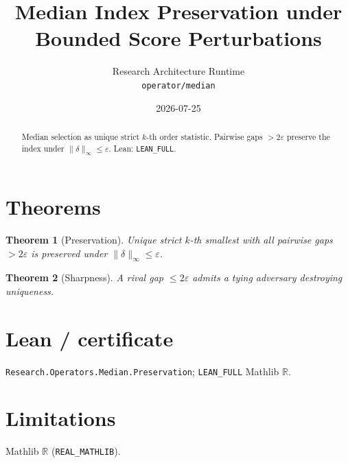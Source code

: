\documentclass[11pt]{article}
\title{Median Index Preservation under Bounded Score Perturbations}
\author{Research Architecture Runtime \\ \texttt{operator/median}}
\date{2026-07-25}
\newtheorem{theorem}{Theorem}
\begin{document}
\maketitle
\begin{abstract}
Median selection as unique strict $k$-th order statistic. Pairwise gaps $>2\varepsilon$
preserve the index under $\|\delta\|_\infty\le\varepsilon$. Lean: \texttt{LEAN\_FULL}.
\end{abstract}
\section{Theorems}
\begin{theorem}[Preservation]
Unique strict $k$-th smallest with all pairwise gaps $>2\varepsilon$ is preserved under
$\|\delta\|_\infty\le\varepsilon$.
\end{theorem}
\begin{theorem}[Sharpness]
A rival gap $\le 2\varepsilon$ admits a tying adversary destroying uniqueness.
\end{theorem}
\section{Lean / certificate}
\texttt{Research.Operators.Median.Preservation}; \texttt{LEAN\_FULL} Mathlib $\mathbb{R}$.
\section{Limitations}
Mathlib $\mathbb{R}$ (\texttt{REAL\_MATHLIB}).
\end{document}
